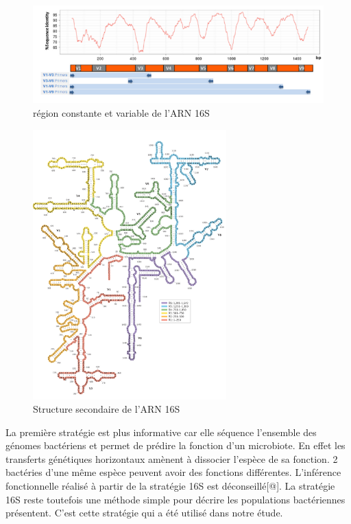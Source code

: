 \documentclass[12pt,a4paper]{article}
\begin{document}
\begin{figure}[ht]
\begin{center}
\includegraphics[scale=0.8]{img/ARN16S_variation.png}\hfill
\end{center}
\caption{région constante et variable de l'ARN 16S}
\label{ARN16SVariation}
\end{figure}

\begin{figure}[ht]
\begin{center}
\includegraphics[scale=0.8]{img/ARN_16S.png}\hfill
\end{center}
\caption{Structure secondaire de l'ARN 16S}
\label{ARN16S}
\end{figure}


La première stratégie est plus informative car elle séquence l'ensemble des génomes bactériens et permet de prédire la fonction d'un microbiote. En effet les transferts génétiques horizontaux amènent à dissocier l'espèce de sa fonction. 2 bactéries d'une même espèce peuvent avoir des fonctions différentes. L'inférence fonctionnelle réalisé à partir de la stratégie 16S est déconseillé[@].  
La stratégie 16S reste toutefois une méthode simple pour décrire les populations bactériennes présentent. C'est cette stratégie qui a été utilisé dans notre étude. 
\end{document}
